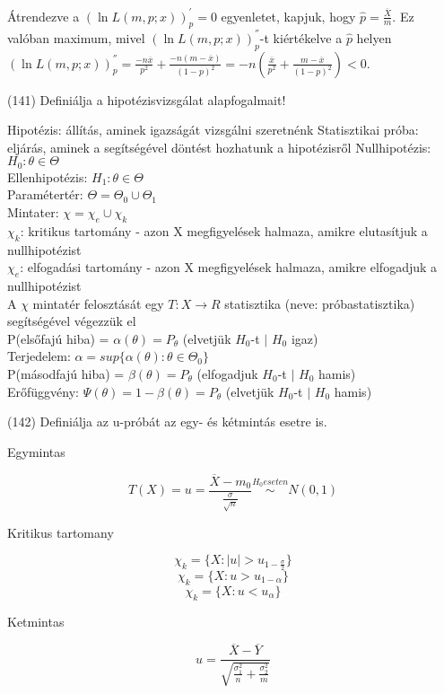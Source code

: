 \documentclass[12p]{article}
\begin{document}
Átrendezve a $(\ln L(m,p;x))^{'}_p = 0$ egyenletet, kapjuk, hogy $\hat{p} = \frac{\overline{X}}{m}$.  Ez valóban maximum, mivel $(\ln L(m,p;x))^{''}_p$-t kiértékelve a $\hat{p}$ helyen $(\ln L(m,p;x))^{''}_p = \frac{-n \overline{x}}{p^2} + \frac{-n(m-\overline{x})}{(1-p)^2}=
-n\left(\frac{\overline{x}}{p^2}+\frac{m - \overline{x}}{(1-p)^2}\right)<0$.

(141) Definiálja a hipotézisvizsgálat alapfogalmait!

Hipotézis: állítás, aminek igazságát vizsgálni szeretnénk
Statisztikai próba: eljárás, aminek a segítségével döntést hozhatunk a hipotézisről
Nullhipotézis: $H_0 : \theta \in \Theta$\\
Ellenhipotézis: $H_1 : \theta \in \Theta$\\
Paramétertér: $\Theta = \Theta_0 \cup \Theta_1$\\
Mintater: $\chi = \chi_e \cup \chi_k$\\
$\chi_k$: kritikus tartomány - azon X megfigyelések halmaza, amikre elutasítjuk a nullhipotézist\\
$\chi_e$: elfogadási tartomány - azon X megfigyelések halmaza, amikre elfogadjuk a nullhipotézist\\
A $\chi$ mintatér felosztását egy $T : X \rightarrow R$ statisztika (neve: próbastatisztika) segítségével végezzük el\\
P(elsőfajú hiba) = $\alpha(\theta) = P_\theta$ (elvetjük $H_0$-t $|$ $H_0$ igaz)\\
Terjedelem: $\alpha = sup\{\alpha(\theta) : \theta \in \Theta_0\}$\\
P(másodfajú hiba) = $\beta(\theta) = P_\theta$ (elfogadjuk $H_0$-t $|$ $H_0$ hamis)\\
Erőfüggvény: $\Psi(\theta) = 1 - \beta(\theta) = P_\theta$ (elvetjük $H_0$-t $|$ $H_0$ hamis)

(142)  Definiálja az u-próbát az egy- és kétmintás esetre is.

Egymintas

$$T(X) = u = \frac{\overline{X} - m_0}{\frac{\sigma}{\sqrt{n}}} \stackrel{H_0 eseten}{\sim} N(0, 1)$$

Kritikus tartomany

$$\chi_k = \{X: |u| > u_{1-\frac{\sigma}{2}}\}$$
$$\chi_k = \{X: u > u_{1-\alpha}\}$$
$$\chi_k = \{X: u < u_\alpha\}$$

Ketmintas

$$\displaystyle{u = \frac{\overline{X} - \overline{Y}}{\sqrt{\frac{\sigma_1^2}{n} + \frac{\sigma_2^2}{m}}}}$$
\end{document}
